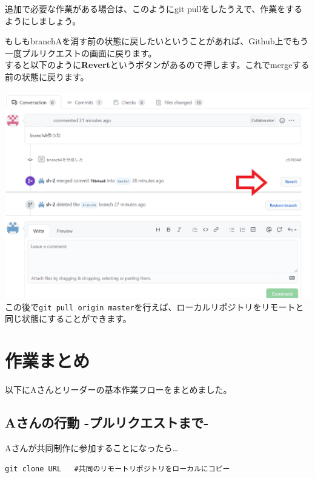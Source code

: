 \documentclass[
]{book}
\begin{document}
追加で必要な作業がある場合は、このようにgit pullをしたうえで、作業をするようにしましょう。

もしもbranchAを消す前の状態に戻したいということがあれば、Github上でもう一度プルリクエストの画面に戻ります。\\
すると以下のように\textbf{Revert}というボタンがあるので押します。これでmergeする前の状態に戻ります。

\includegraphics{pics/branch04.png}
この後で\texttt{git\ pull\ origin\ master}を行えば、ローカルリポジトリをリモートと同じ状態にすることができます。

\hypertarget{ux4f5cux696dux307eux3068ux3081}{%
\section{作業まとめ}\label{ux4f5cux696dux307eux3068ux3081}}

以下にAさんとリーダーの基本作業フローをまとめました。

\hypertarget{aux3055ux3093ux306eux884cux52d5--ux30d7ux30ebux30eaux30afux30a8ux30b9ux30c8ux307eux3067-}{%
\subsection{Aさんの行動 -プルリクエストまで-}\label{aux3055ux3093ux306eux884cux52d5--ux30d7ux30ebux30eaux30afux30a8ux30b9ux30c8ux307eux3067-}}

Aさんが共同制作に参加することになったら\ldots{}

\begin{verbatim}
git clone URL   #共同のリモートリポジトリをローカルにコピー
\end{verbatim}
\end{document}
